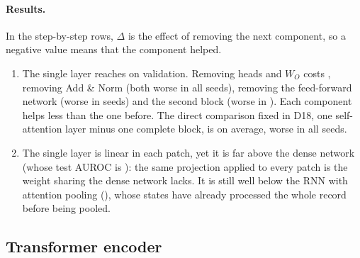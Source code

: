\paragraph{Results.} In the step-by-step rows, $\Delta$ is the effect of removing the next component, so
a negative value means that the component helped.
\begin{enumerate}[leftmargin=1.4em,itemsep=2pt]
  \item The single layer reaches \transformerValAurocMeanSaSingle{} on validation. Removing heads and
        $W_O$ costs \transformerDiffMeanSaSingle{}, removing Add \& Norm \transformerDiffMeanMhsa{}
        (both worse in all \transformerNSeedsComparedMhsa{} seeds), removing the feed-forward network
        \transformerDiffMeanNoFfn{} (worse in \transformerNSeedsWorseNoFfn{} seeds) and the second block
        \transformerDiffMeanLayersOne{} (worse in \transformerNSeedsWorseLayersOne{}). Each component helps
        less than the one before. The direct comparison fixed in D18, one self-attention layer minus one
        complete block, is \transformerPairSaVsBlockMean{} on average, worse in all
        \transformerPairSaVsBlockNCompared{} seeds.
  \item The single layer is linear in each patch, yet it is far above the dense network (whose test
        AUROC is \denseFinalTestMacroAurocMean{}): the same projection applied to every patch is the
        weight sharing the dense network lacks. It is still well below the RNN with attention pooling
        (\rnnValAurocMeanAttn{}), whose states have already processed the whole record before being
        pooled.
\end{enumerate}

\subsection{Transformer encoder}\label{sec:transformer}

